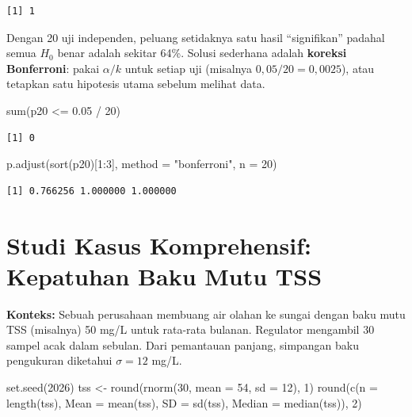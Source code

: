 \documentclass[
  indonesian,
  letterpaper,
]{book}
\newenvironment{Shaded}{\begin{snugshade}}{\end{snugshade}}
\newcommand{\AttributeTok}[1]{\textcolor[rgb]{0.40,0.45,0.13}{#1}}
\newcommand{\DecValTok}[1]{\textcolor[rgb]{0.68,0.00,0.00}{#1}}
\newcommand{\FloatTok}[1]{\textcolor[rgb]{0.68,0.00,0.00}{#1}}
\newcommand{\FunctionTok}[1]{\textcolor[rgb]{0.28,0.35,0.67}{#1}}
\newcommand{\NormalTok}[1]{\textcolor[rgb]{0.00,0.23,0.31}{#1}}
\newcommand{\OtherTok}[1]{\textcolor[rgb]{0.00,0.23,0.31}{#1}}
\newcommand{\SpecialCharTok}[1]{\textcolor[rgb]{0.37,0.37,0.37}{#1}}
\newcommand{\StringTok}[1]{\textcolor[rgb]{0.13,0.47,0.30}{#1}}
\begin{document}
\begin{verbatim}
[1] 1
\end{verbatim}

Dengan 20 uji independen, peluang setidaknya satu hasil ``signifikan''
padahal semua \(H_0\) benar adalah sekitar 64\%. Solusi sederhana adalah
\textbf{koreksi Bonferroni}: pakai \(\alpha/k\) untuk setiap uji
(misalnya \(0{,}05/20 = 0{,}0025\)), atau tetapkan satu hipotesis utama
sebelum melihat data.

\begin{Shaded}
\begin{Highlighting}[]
\FunctionTok{sum}\NormalTok{(p20 }\SpecialCharTok{\textless{}=} \FloatTok{0.05} \SpecialCharTok{/} \DecValTok{20}\NormalTok{)}
\end{Highlighting}
\end{Shaded}

\begin{verbatim}
[1] 0
\end{verbatim}

\begin{Shaded}
\begin{Highlighting}[]
\FunctionTok{p.adjust}\NormalTok{(}\FunctionTok{sort}\NormalTok{(p20)[}\DecValTok{1}\SpecialCharTok{:}\DecValTok{3}\NormalTok{], }\AttributeTok{method =} \StringTok{"bonferroni"}\NormalTok{, }\AttributeTok{n =} \DecValTok{20}\NormalTok{)}
\end{Highlighting}
\end{Shaded}

\begin{verbatim}
[1] 0.766256 1.000000 1.000000
\end{verbatim}

\section{Studi Kasus Komprehensif: Kepatuhan Baku Mutu
TSS}\label{studi-kasus-komprehensif-kepatuhan-baku-mutu-tss}

\textbf{Konteks:} Sebuah perusahaan membuang air olahan ke sungai dengan
baku mutu TSS (misalnya) 50 mg/L untuk rata-rata bulanan. Regulator
mengambil 30 sampel acak dalam sebulan. Dari pemantauan panjang,
simpangan baku pengukuran diketahui \(\sigma = 12\) mg/L.

\begin{Shaded}
\begin{Highlighting}[]
\FunctionTok{set.seed}\NormalTok{(}\DecValTok{2026}\NormalTok{)}
\NormalTok{tss }\OtherTok{\textless{}{-}} \FunctionTok{round}\NormalTok{(}\FunctionTok{rnorm}\NormalTok{(}\DecValTok{30}\NormalTok{, }\AttributeTok{mean =} \DecValTok{54}\NormalTok{, }\AttributeTok{sd =} \DecValTok{12}\NormalTok{), }\DecValTok{1}\NormalTok{)}
\FunctionTok{round}\NormalTok{(}\FunctionTok{c}\NormalTok{(}\AttributeTok{n =} \FunctionTok{length}\NormalTok{(tss), }\AttributeTok{Mean =} \FunctionTok{mean}\NormalTok{(tss), }\AttributeTok{SD =} \FunctionTok{sd}\NormalTok{(tss), }\AttributeTok{Median =} \FunctionTok{median}\NormalTok{(tss)), }\DecValTok{2}\NormalTok{)}
\end{Highlighting}
\end{Shaded}
\end{document}
